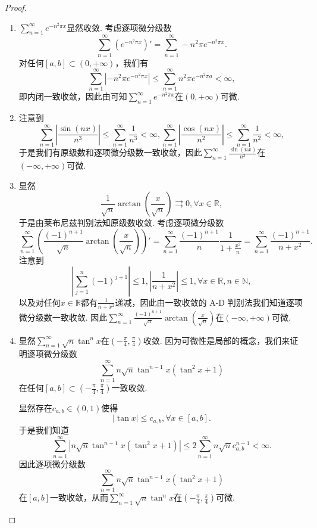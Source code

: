 \documentclass[../../main.tex]{subfiles}%
\begin{document}
\begin{proof}
\begin{enumerate}
\item \(\sum_{n=1}^{\infty} e^{-n^2 \pi x}\)显然收敛. 考虑逐项微分级数
\[
\sum_{n=1}^{\infty} \left( e^{-n^2 \pi x} \right)' = \sum_{n=1}^{\infty} -n^2 \pi e^{-n^2 \pi x}.
\]
对任何\([a, b] \subset (0, +\infty)\)，我们有
\[
\sum_{n=1}^{\infty} \left| -n^2 \pi e^{-n^2 \pi x} \right| \leqslant \sum_{n=1}^{\infty} n^2 \pi e^{-n^2 \pi a} < \infty,
\]
即内闭一致收敛，因此由可知\(\sum_{n=1}^{\infty} e^{-n^2 \pi x}\)在\((0, +\infty)\)可微.

\item  注意到
\[
\sum_{n=1}^{\infty} \left| \frac{\sin(nx)}{n^3} \right| \leqslant \sum_{n=1}^{\infty} \frac{1}{n^3} < \infty, \sum_{n=1}^{\infty} \left| \frac{\cos(nx)}{n^2} \right| \leqslant \sum_{n=1}^{\infty} \frac{1}{n^2} < \infty,
\]
于是我们有原级数和逐项微分级数一致收敛，因此\(\sum_{n=1}^{\infty} \frac{\sin(nx)}{n^3}\)在\((-\infty, +\infty)\)可微.

\item 显然
\[
\frac{1}{\sqrt{n}} \arctan \left( \frac{x}{\sqrt{n}} \right) \rightrightarrows 0, \forall x \in \mathbb{R},
\]
于是由莱布尼兹判别法知原级数收敛. 考虑逐项微分级数
\[
\sum_{n=1}^{\infty} \left( \frac{(-1)^{n+1}}{\sqrt{n}} \arctan \left( \frac{x}{\sqrt{n}} \right) \right)' = \sum_{n=1}^{\infty} \frac{(-1)^{n+1}}{n} \frac{1}{1 + \frac{x^2}{n}} = \sum_{n=1}^{\infty} \frac{(-1)^{n+1}}{n + x^2}.
\]
注意到
\[
\left| \sum_{j=1}^{n} (-1)^{j+1} \right| \leqslant 1, \left| \frac{1}{n + x^2} \right| \leqslant 1, \forall x \in \mathbb{R}, n \in \mathbb{N},
\]
以及对任何\(x \in \mathbb{R}\)都有\(\frac{1}{n + x^2}\)递减，因此由一致收敛的 A-D 判别法我们知道逐项微分级数一致收敛. 因此\(\sum_{n=1}^{\infty} \frac{(-1)^{n+1}}{\sqrt{n}} \arctan \left( \frac{x}{\sqrt{n}} \right)\)在\((-\infty, +\infty)\)可微.

\item 显然\(\sum_{n=1}^{\infty} \sqrt{n} \tan^n x\)在\(\left( -\frac{\pi}{4}, \frac{\pi}{4} \right)\)收敛. 因为可微性是局部的概念，我们来证明逐项微分级数
\[
\sum_{n=1}^{\infty} n \sqrt{n} \tan^{n - 1} x \left( \tan^2 x + 1 \right)
\]
在任何\([a, b] \subset \left( -\frac{\pi}{4}, \frac{\pi}{4} \right)\)一致收敛.

显然存在\(c_{a,b} \in (0, 1)\)使得
\[
|\tan x| \leqslant c_{a,b}, \forall x \in [a, b].
\]
于是我们知道
\[
\sum_{n=1}^{\infty} \left| n \sqrt{n} \tan^{n - 1} x \left( \tan^2 x + 1 \right) \right| \leqslant 2 \sum_{n=1}^{\infty} n \sqrt{n} c_{a,b}^{n - 1} < \infty.
\]
因此逐项微分级数
\[
\sum_{n=1}^{\infty} n \sqrt{n} \tan^{n - 1} x \left( \tan^2 x + 1 \right)
\]
在\([a, b]\)一致收敛，从而\(\sum_{n=1}^{\infty} \sqrt{n} \tan^n x\)在\(\left( -\frac{\pi}{4}, \frac{\pi}{4} \right)\)可微.
\end{enumerate}

\end{proof}
\end{document}
